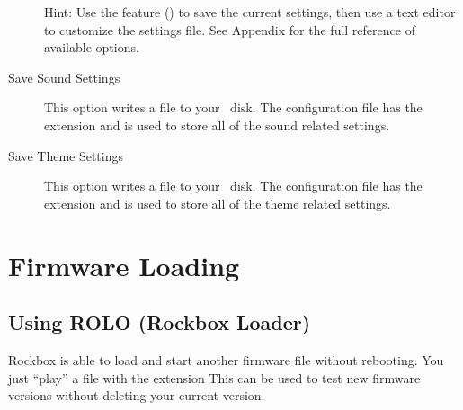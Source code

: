 \begin{description}
  Hint: Use the  feature () to save the current settings, then 
  use a text editor to customize the settings file. See Appendix 
   for the full reference of available 
  options.
  
\item [Save Sound Settings]This option writes a  file to 
  your \daps\ disk.  The configuration file has the  
  extension and is used to store all of the sound related settings.
    
\item [Save Theme Settings]This option writes a  file to 
  your \daps\ disk.  The configuration file has the  
  extension and is used to store all of the theme related settings.

\end{description}

\section{\label{ref:FirmwareLoading}Firmware Loading}

\subsection{\label{ref:using_rolo}Using ROLO (Rockbox Loader)}
Rockbox is able to load and start another firmware file without rebooting. 
You just ``play'' a file with the extension %
This can be used to test new firmware versions without deleting your
current version.


